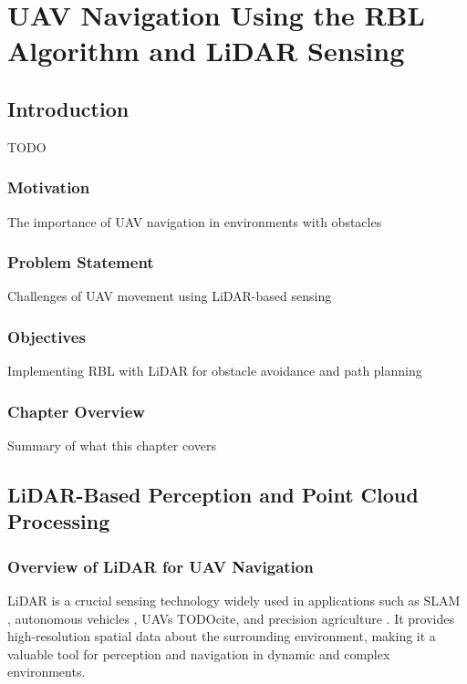 \chapter{UAV Navigation Using the RBL Algorithm and LiDAR Sensing\label{chap:lidar}}

    \section{Introduction}
        TODO
        \subsection{Motivation}
            The importance of UAV navigation in environments with obstacles
        \subsection{Problem Statement}
            Challenges of UAV movement using LiDAR-based sensing
        \subsection{Objectives}
            Implementing RBL with LiDAR for obstacle avoidance and path planning
        \subsection{Chapter Overview}
            Summary of what this chapter covers

    \section{LiDAR-Based Perception and Point Cloud Processing}
        \subsection{Overview of LiDAR for UAV Navigation}
            \ac{LiDAR} is a crucial sensing technology widely used in applications such as SLAM \cite{pointlio_mrs}, autonomous vehicles \cite{Lidar_autonomous_vehicles}, UAVs TODOcite, and precision agriculture \cite{Lidar_agriculture}. 
            It provides high-resolution spatial data about the surrounding environment, making it a valuable tool for perception and navigation in dynamic and complex environments.  
            
